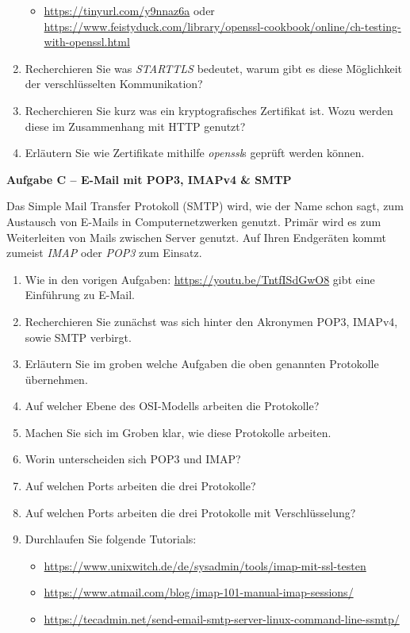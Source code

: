 \documentclass[paper=a4,fontsize=11pt]{scrartcl}%
\numberwithin{equation}{section}
\begin{document}
\begin{enumerate}
\begin{itemize}
		\item  \url{https://tinyurl.com/y9nnaz6a} oder \url{https://www.feistyduck.com/library/openssl-cookbook/online/ch-testing-with-openssl.html}
	\end{itemize}
	\item Recherchieren Sie was \emph{STARTTLS} bedeutet, warum gibt es diese Möglichkeit der verschlüsselten Kommunikation?
	\item Recherchieren Sie kurz was ein kryptografisches Zertifikat ist. Wozu werden diese im Zusammenhang mit HTTP genutzt?
	\item Erläutern Sie wie Zertifikate mithilfe \emph{openssl}s geprüft werden können.  
\end{enumerate}

\begin{center}\Large{\textbf{Aufgabe C -- E-Mail mit POP3, IMAPv4 \& SMTP}}\end{center}\vskip0.25in
Das Simple Mail Transfer Protokoll (SMTP) wird, wie der Name schon sagt, zum Austausch von E-Mails in Computernetzwerken genutzt. Primär wird es zum Weiterleiten von Mails zwischen Server genutzt. Auf Ihren Endgeräten kommt zumeist \emph{IMAP} oder \emph{POP3} zum Einsatz. 
\begin{enumerate}
	\item Wie in den vorigen Aufgaben: \url{https://youtu.be/TntfISdGwO8} gibt eine Einführung zu E-Mail.
	\item Recherchieren Sie zunächst was sich hinter den Akronymen POP3, IMAPv4, sowie SMTP verbirgt.
	\item Erläutern Sie im groben welche Aufgaben die oben genannten Protokolle übernehmen.
	\item Auf welcher Ebene des OSI-Modells arbeiten die Protokolle?
	\item Machen Sie sich im Groben klar, wie diese Protokolle arbeiten.	
	\item Worin unterscheiden sich POP3 und IMAP?
	\item Auf welchen Ports arbeiten die drei Protokolle?
	\item Auf welchen Ports arbeiten die drei Protokolle mit Verschlüsselung?
	\item Durchlaufen Sie folgende Tutorials:
	\begin{itemize}
		\item \url{https://www.unixwitch.de/de/sysadmin/tools/imap-mit-ssl-testen}
		\item \url{https://www.atmail.com/blog/imap-101-manual-imap-sessions/}
		\item \url{https://tecadmin.net/send-email-smtp-server-linux-command-line-ssmtp/}
	\end{itemize}
\end{enumerate}
\end{document}
